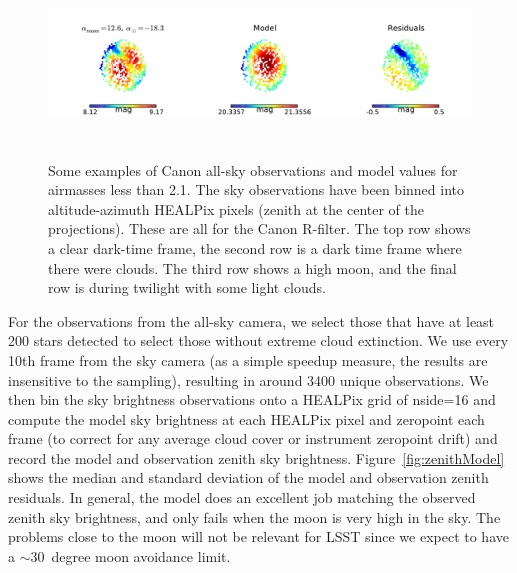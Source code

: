 \documentclass[]{spie}
\begin{document}
\begin{figure}[ht]
\begin{center}
  \includegraphics[height=5cm]{plots/exampleSkys_3.pdf}
  \end{center}
  \caption{Some examples of Canon all-sky observations and model values for airmasses less than 2.1. The sky observations have been binned into altitude-azimuth HEALPix pixels (zenith at the center of the projections). These are all for the Canon R-filter. The top row shows a clear dark-time frame, the second row is a dark time frame where there were clouds. The third row shows a high moon, and the final row is during twilight with some light clouds. \label{fig:skyExamples}}
\end{figure}


For the observations from the all-sky camera, we select those that have at least 200 stars detected to select those without extreme cloud extinction. We use every 10th frame from the sky camera (as a simple speedup measure, the results are insensitive to the sampling), resulting in around 3400 unique observations.  We then bin the sky brightness observations onto a HEALPix grid of nside=16 and compute the model sky brightness at each HEALPix pixel and zeropoint each frame (to correct for any average cloud cover or instrument zeropoint drift) and record the model and observation zenith sky brightness. Figure~\ref{fig:zenithModel} shows the median and standard deviation of the model and observation zenith residuals.  In general, the model does an excellent job matching the observed zenith sky brightness, and only fails when the moon is very high in the sky.  The problems close to the moon will not be relevant for LSST since we expect to have a $\sim30$\ degree moon avoidance limit.
\end{document}
